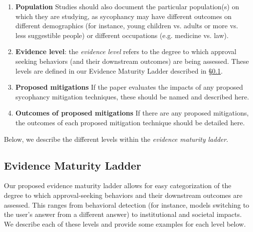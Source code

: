 \begin{enumerate}
    \item \textbf{Population} Studies should also document the particular population(s) on which they are studying, as sycophancy may have different outcomes on different demographics (for instance, young children vs. adults or more vs. less suggestible people) or different occupations (e.g. medicine vs. law).
    \item \textbf{Evidence level}: the \emph{evidence level} refers to the degree to which approval seeking behaviors (and their downstream outcomes) are being assessed. These levels are defined in our Evidence Maturity Ladder described in \S\ref{sec:evidence-maturity}. 
    \item \textbf{Proposed mitigations} If the paper evaluates the impacts of any proposed sycophancy mitigation techniques, these should be named and described here. 
    \item \textbf{Outcomes of proposed mitigations} If there are any proposed mitigations, the outcomes of each proposed mitigation technique should be detailed here.
\end{enumerate}

Below, we describe the different levels within the \emph{evidence maturity ladder}.

\subsection{Evidence Maturity Ladder}
\label{sec:evidence-maturity}

Our proposed evidence maturity ladder allows for easy categorization of the degree to which approval-seeking behaviors and their downstream outcomes are assessed. This ranges from behavioral detection (for instance, models switching to the user's answer from a different answer) to institutional and societal impacts. We describe each of these levels and provide some examples for each level below.

